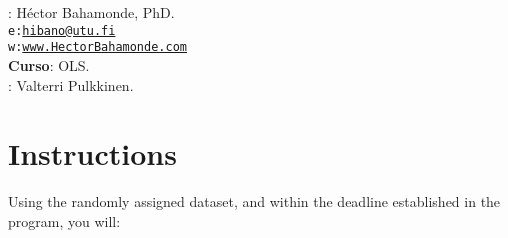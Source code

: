 \documentclass[10pt]{article}
\begin{document}


\thispagestyle{fancy} %





\hspace{-5mm}{\bf Professor}: H\'ector Bahamonde, PhD.\\
\texttt{e:}\href{mailto:hibano@utu.fi}{\texttt{hibano@utu.fi}}\\
\texttt{w:}\href{http://www.hectorbahamonde.com}{\texttt{www.HectorBahamonde.com}}\\
{\bf Curso}: OLS.\\
\hspace{-5mm}{\bf TA}: Valterri Pulkkinen.


\vspace{-0.8cm}
\section*{Instructions}

Using the randomly assigned dataset, and within the deadline established in the program, you will:
\end{document}
